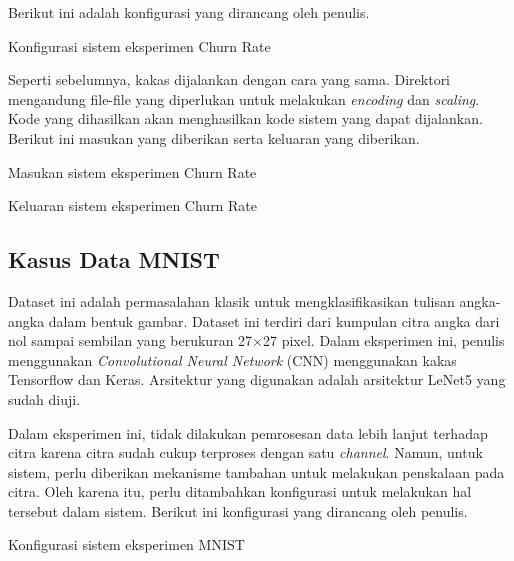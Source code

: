 Berikut ini adalah konfigurasi yang dirancang oleh penulis.

\begin{code}
	\caption{Konfigurasi sistem eksperimen Churn Rate}\label{listing:22}
\end{code}

Seperti sebelumnya, kakas dijalankan dengan cara yang sama.
Direktori mengandung file-file yang diperlukan untuk melakukan \textit{encoding} dan \textit{scaling}.
Kode yang dihasilkan akan menghasilkan kode sistem yang dapat dijalankan.
Berikut ini masukan yang diberikan serta keluaran yang diberikan.

\begin{code}
	\caption{Masukan sistem eksperimen Churn Rate}\label{listing:24}
\end{code}

\begin{code}
	\caption{Keluaran sistem eksperimen Churn Rate}\label{listing:25}
\end{code}

\subsection{Kasus Data MNIST}

Dataset ini adalah permasalahan klasik untuk mengklasifikasikan tulisan angka-angka dalam bentuk gambar.
Dataset ini terdiri dari kumpulan citra angka dari nol sampai sembilan yang berukuran 27\(\times\)27 pixel.
Dalam eksperimen ini, penulis menggunakan \textit{Convolutional Neural Network} (CNN) menggunakan kakas Tensorflow dan Keras.
Arsitektur yang digunakan adalah arsitektur LeNet5 yang sudah diuji.

Dalam eksperimen ini, tidak dilakukan pemrosesan data lebih lanjut terhadap citra karena citra sudah cukup terproses dengan satu \textit{channel}.
Namun, untuk sistem, perlu diberikan mekanisme tambahan untuk melakukan penskalaan pada citra.
Oleh karena itu, perlu ditambahkan konfigurasi untuk melakukan hal tersebut dalam sistem.
Berikut ini konfigurasi yang dirancang oleh penulis.

\begin{code}
	\caption{Konfigurasi sistem eksperimen MNIST}\label{listing:26}
\end{code}

